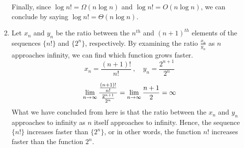 \documentclass[11pt]{article}
\begin{document}
\begin{enumerate}[label=\textbf{\alph*)}]
\begin{itemize}
	\end{itemize}
		Finally, since $\log n! = \Omega(n\log n)$ and $\log n! = O(n\log n)$, we can conclude by saying $\log n! = \Theta(n\log n)$.\\
		\newpage
	\item Let $x_n$ and $y_n$ be the ratio between the $n^{th}$ and $(n+1)^{th}$ elements of the sequences $\{n!\}$ and $\{2^n\}$, respectively. By examining the ratio $\frac{x_n}{y_n}$ as $n$ approaches infinity, we can find which function grows faster.\\
		\[x_n = \frac{(n+1)!}{n!}\ ,\quad y_n = \frac{2^{n+1}}{2^n}\]

		\begin{equation*}
			\lim_{n \to \infty}{\frac{\frac{(n+1)!}{n!}}{\frac{2^{n+1}}{2^n}}}= \lim_{n \to \infty}{\frac{n+1}{2}}=\infty\\
		\end{equation*}
		What we have concluded from here is that the ratio between the $x_n$ and $y_n$ approaches to infinity as $n$ itself approaches to infinity. Hence, the sequence $\{n!\}$ increases faster than $\{2^n\}$, or in other words, the function $n!$ increases faster than the function $2^n$.
\end{enumerate}
\end{document}
